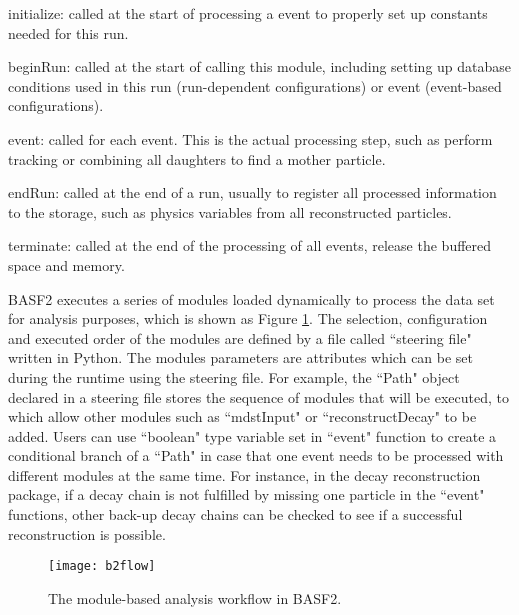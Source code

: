 \textbullet \space initialize: called at the start of processing a event to properly set up constants needed for this run.

\textbullet \space beginRun: called at the start of calling this module, including setting up database conditions used in this run (run-dependent configurations) or event (event-based configurations).

\textbullet \space event: called for each event. This is the actual processing step, such as perform tracking or combining all daughters to find a mother particle. 

\textbullet \space endRun: called at the end of a run, usually to register all processed information to the storage, such as physics variables from all reconstructed particles.

\textbullet \space terminate: called at the end of the processing of all events, release the buffered space and memory.

BASF2 executes a series of modules loaded dynamically to process the data set for analysis purposes, which is shown as Figure \ref{fig:b2flow}. The selection, configuration and executed order of the modules are defined by a file called ``steering file" written in Python. The modules parameters are attributes which can be set during the runtime using the steering file. For example, the ``Path" object declared in a steering file stores the sequence of modules that will be executed, to which allow other modules such as ``mdstInput" or ``reconstructDecay" to be added.
Users can use ``boolean" type variable set in ``event" function to create a conditional branch of a ``Path" in case that one event needs to be processed with different modules at the same time. For instance, in the decay reconstruction package, if a decay chain is not fulfilled by missing one particle in the ``event" functions, other back-up decay chains can be checked to see if a successful reconstruction is possible.  

\begin{figure}[htpb]
	\centering
	\texttt{[image: b2flow]}
	\caption{The module-based analysis workflow in BASF2.}
	\label{fig:b2flow}
\end{figure}

